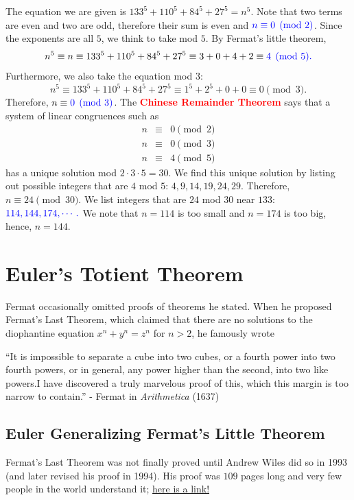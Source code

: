 The equation we are given is $133^5+110^5+84^5+27^5=n^{5}$. Note that two terms are even and two are odd, therefore their sum is even and $\color{blue} n\equiv 0\pmod{2}$. Since the exponents are all $5$, we think to take mod $5$. By Fermat's little theorem, $$n^5\equiv n\equiv 133^5+110^5+84^5+27^5\equiv 3+0+4+2\equiv \color{blue} 4\pmod{5}.$$
Furthermore, we also take the equation mod $3$: $$n^5\equiv 133^{5}+110^{5}+84^{5}+27^{5}\equiv 1^5+2^5+0+0\equiv 0\pmod{3}.$$ Therefore, $n\equiv \color{blue} 0\pmod{3}$. 
\clearpage
The \textbf{\textcolor{red}{Chinese Remainder Theorem}} says that a system of linear congruences such as \begin{eqnarray*} n&\equiv& 0\pmod{2} \\ n &\equiv& 0\pmod{3} \\ n&\equiv& 4\pmod{5} \end{eqnarray*} has a unique solution mod $2\cdot 3\cdot 5=30$. We find this unique solution by listing out possible integers that are $4$ mod $5$: $4, 9, 14, 19, 24, 29$. Therefore, $n\equiv 24\pmod{30}$. 
We list integers that are $24$ mod $30$ near $133$: $\color{blue} 114, 144, 174, \cdots.$  We note that $n=114$ is too small and $n=174$ is too big, hence, $n=\boxed{144}$. 
\section{Euler's Totient Theorem}
Fermat occasionally omitted proofs of theorems he stated. When he proposed Fermat's Last Theorem, which claimed that there are no solutions to the diophantine equation $x^n+y^n=z^n$ for $n>2$, he famously wrote \begin{displayquote} ``It is impossible to separate a cube into two cubes, or a fourth power into two fourth powers, or in general, any power higher than the second, into two like powers.I have discovered a truly marvelous proof of this, which this margin is too narrow to contain.'' - Fermat in \textit{Arithmetica} (1637) \end{displayquote}

\subsection*{Euler Generalizing Fermat's Little Theorem}
Fermat's Last Theorem was not finally proved until Andrew Wiles did so in 1993 (and later revised his proof in 1994). His proof was $109$ pages long and very few people in the world understand it; \href{https://math.stanford.edu/~lekheng/flt/wiles.pdf}{here is a link!}

